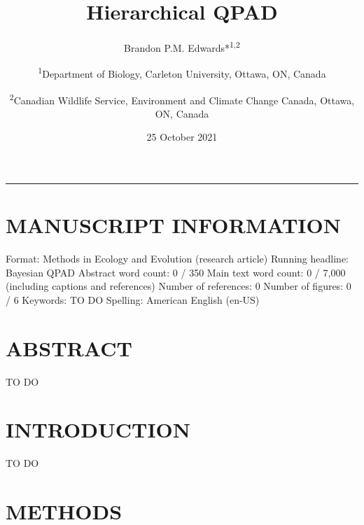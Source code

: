 \documentclass[
  11pt,
]{article}
\title{Hierarchical QPAD}
\author{\normalsize Brandon P.M. Edwards*\textsuperscript{1,2} \and \small \textsuperscript{1}Department of Biology, Carleton University,
Ottawa, ON, Canada \and \small \textsuperscript{2}Canadian Wildlife Service, Environment and
Climate Change Canada, Ottawa, ON, Canada}
\date{25 October 2021}
\begin{document}
\maketitle

\begin{center}\rule{0.5\linewidth}{0.5pt}\end{center}

\doublespacing
\vfill

\hypertarget{manuscript-information}{%
\section{MANUSCRIPT INFORMATION}\label{manuscript-information}}

Format: Methods in Ecology and Evolution (research article) \newline
Running headline: Bayesian QPAD \newline Abstract word count: 0 / 350
\newline Main text word count: 0 / 7,000 (including captions and
references) \newline Number of references: 0 \newline Number of figures:
0 / 6 \newline Keywords: TO DO \newline Spelling: American English
(en-US)

\clearpage
\linenumbers

\hypertarget{abstract}{%
\section{ABSTRACT}\label{abstract}}

\begin{spacing}{1.5}

TO DO

\end{spacing}

\clearpage

\hypertarget{introduction}{%
\section{INTRODUCTION}\label{introduction}}

TO DO

\clearpage

\hypertarget{methods}{%
\section{METHODS}\label{methods}}
\end{document}
